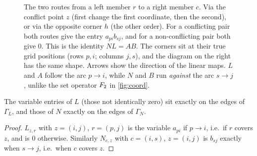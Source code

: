 \begin{figure}[ht]
\centering
{}
\caption{The two routes from a left member $r$ to a right member $c$. Via the
conflict point $z$ (first change the first coordinate, then the second), or
via the opposite corner $h$ (the other order). For a conflicting pair both
routes give the entry $a_{pi}b_{sj}$, and for a non-conflicting pair both
give $0$. This is the identity $NL=AB$. The corners sit at their true
grid positions (rows $p,i$; columns $j,s$), and the diagram on the right
has the same shape. Arrows show the direction of the
linear maps. $L$ and $A$ follow the arc $p\to i$, while $N$ and $B$ run
\emph{against} the arc $s\to j$, unlike the set operator $F_2$ in
\cref{fig:coord}.}
\label{fig:square}
\end{figure}

\begin{claim}\label{cl:supports}
The variable entries of $L$ (those not identically zero) sit exactly on the
edges of $\Gamma_L$, and those of $N$ exactly on the edges of $\Gamma_N$.
\end{claim}

\begin{proof}
$L_{z,r}$ with $z=(i,j)$, $r=(p,j)$ is the variable $a_{pi}$ if $p\to i$, i.e.\
if $r$ covers $z$, and is $0$ otherwise. Similarly $N_{c,z}$ with $c=(i,s)$,
$z=(i,j)$ is $b_{sj}$ exactly when $s\to j$, i.e.\ when $c$ covers $z$.
\end{proof}

